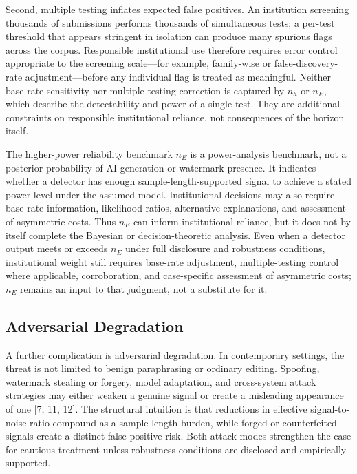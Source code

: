 \documentclass[11pt]{article}
\begin{document}
Second, multiple testing inflates expected false positives. An institution screening
thousands of submissions performs thousands of simultaneous tests; a per-test
threshold that appears stringent in isolation can produce many spurious flags across
the corpus. Responsible institutional use therefore requires error control
appropriate to the screening scale---for example, family-wise or
false-discovery-rate adjustment---before any individual flag is treated as
meaningful. Neither base-rate sensitivity nor multiple-testing correction is captured
by $n_h$ or $n_E$, which describe the detectability and power of a single test. They
are additional constraints on responsible institutional reliance, not consequences of
the horizon itself.

The higher-power reliability benchmark $n_E$ is a power-analysis benchmark, not a
posterior probability of AI generation or watermark presence. It indicates whether a
detector has enough sample-length-supported signal to achieve a stated power level
under the assumed model. Institutional decisions may also require base-rate
information, likelihood ratios, alternative explanations, and assessment of
asymmetric costs. Thus $n_E$ can inform institutional reliance, but it does not by
itself complete the Bayesian or decision-theoretic analysis. Even when a detector
output meets or exceeds $n_E$ under full disclosure and robustness conditions,
institutional weight still requires base-rate adjustment, multiple-testing control
where applicable, corroboration, and case-specific assessment of asymmetric costs;
$n_E$ remains an input to that judgment, not a substitute for it.

\subsection{Adversarial Degradation}

A further complication is adversarial degradation. In contemporary settings, the
threat is not limited to benign paraphrasing or ordinary editing. Spoofing,
watermark stealing or forgery, model adaptation, and cross-system attack strategies
may either weaken a genuine signal or create a misleading appearance of one
[7, 11, 12]. The structural intuition is that reductions in effective
signal-to-noise ratio compound as a sample-length burden, while forged or
counterfeited signals create a distinct false-positive risk. Both attack modes
strengthen the case for cautious treatment unless robustness conditions are disclosed
and empirically supported.
\end{document}
